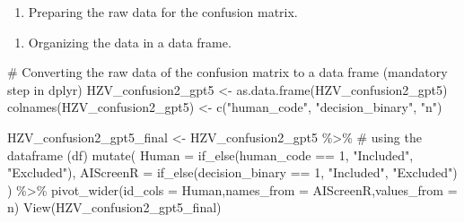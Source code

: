 \documentclass[
  letterpaper,
  DIV=11,
  numbers=noendperiod]{scrartcl}
\newenvironment{Shaded}{\begin{snugshade}}{\end{snugshade}}
\newcommand{\AttributeTok}[1]{\textcolor[rgb]{0.40,0.45,0.13}{#1}}
\newcommand{\CommentTok}[1]{\textcolor[rgb]{0.37,0.37,0.37}{#1}}
\newcommand{\DecValTok}[1]{\textcolor[rgb]{0.68,0.00,0.00}{#1}}
\newcommand{\FunctionTok}[1]{\textcolor[rgb]{0.28,0.35,0.67}{#1}}
\newcommand{\NormalTok}[1]{\textcolor[rgb]{0.00,0.23,0.31}{#1}}
\newcommand{\OtherTok}[1]{\textcolor[rgb]{0.00,0.23,0.31}{#1}}
\newcommand{\SpecialCharTok}[1]{\textcolor[rgb]{0.37,0.37,0.37}{#1}}
\newcommand{\StringTok}[1]{\textcolor[rgb]{0.13,0.47,0.30}{#1}}
\providecommand{\tightlist}{%
  \setlength{\itemsep}{0pt}\setlength{\parskip}{0pt}}
\begin{document}
\begin{enumerate}
\def\labelenumi{\arabic{enumi}.}
\tightlist
\item
  Preparing the raw data for the confusion matrix.
\end{enumerate}

\begin{Shaded}
\end{Shaded}

\begin{enumerate}
\def\labelenumi{\arabic{enumi}.}
\setcounter{enumi}{1}
\tightlist
\item
  Organizing the data in a data frame.
\end{enumerate}

\begin{Shaded}
\begin{Highlighting}[]
\CommentTok{\# Converting the raw data of the confusion matrix to a data frame (mandatory step in dplyr)}
\NormalTok{HZV\_confusion2\_gpt5 }\OtherTok{\textless{}{-}} \FunctionTok{as.data.frame}\NormalTok{(HZV\_confusion2\_gpt5)}
\FunctionTok{colnames}\NormalTok{(HZV\_confusion2\_gpt5) }\OtherTok{\textless{}{-}} \FunctionTok{c}\NormalTok{(}\StringTok{"human\_code"}\NormalTok{, }\StringTok{"decision\_binary"}\NormalTok{, }\StringTok{"n"}\NormalTok{)}

\NormalTok{HZV\_confusion2\_gpt5\_final }\OtherTok{\textless{}{-}}\NormalTok{ HZV\_confusion2\_gpt5 }\SpecialCharTok{\%\textgreater{}\%} \CommentTok{\# using the dataframe (df)}
  \FunctionTok{mutate}\NormalTok{(}
    \AttributeTok{Human =} \FunctionTok{if\_else}\NormalTok{(human\_code }\SpecialCharTok{==} \DecValTok{1}\NormalTok{, }\StringTok{"Included"}\NormalTok{, }\StringTok{"Excluded"}\NormalTok{),}
    \AttributeTok{AIScreenR =} \FunctionTok{if\_else}\NormalTok{(decision\_binary }\SpecialCharTok{==} \DecValTok{1}\NormalTok{, }\StringTok{"Included"}\NormalTok{, }\StringTok{"Excluded"}\NormalTok{)}
\NormalTok{  ) }\SpecialCharTok{\%\textgreater{}\%}
    \FunctionTok{pivot\_wider}\NormalTok{(}\AttributeTok{id\_cols =}\NormalTok{ Human,}\AttributeTok{names\_from =}\NormalTok{ AIScreenR,}\AttributeTok{values\_from =}\NormalTok{ n)}
\FunctionTok{View}\NormalTok{(HZV\_confusion2\_gpt5\_final)}
\end{Highlighting}
\end{Shaded}
\end{document}
